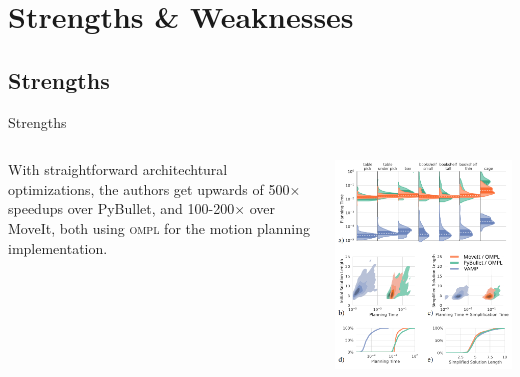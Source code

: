 \documentclass{beamer}
\begin{document}
\section{Strengths \& Weaknesses}

\subsection{Strengths}

\begin{frame}{Strengths}
\begin{columns}
\begin{column}{0.5\textwidth}
With straightforward architechtural optimizations, the authors get upwards of 500$\times$ speedups over PyBullet, and 100-200$\times$ over MoveIt, both using \textsc{ompl} for the motion planning implementation.
\end{column}
\begin{column}{0.5\textwidth}
\includegraphics[width=\textwidth]{./assets/panda_graphs.png}
\end{column}
\end{columns}

\end{frame}
\end{document}
